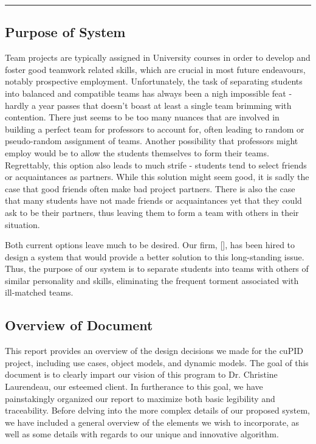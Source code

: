 \documentclass[12pt,letterpaper]{article}
\begin{document}
\begin{center}
    \rule{0.85\textwidth}{0.5pt}
\end{center}

\subsection{Purpose of System}

Team projects are typically assigned in University courses in order to develop and foster
good teamwork related skills, which are crucial in most future endeavours, notably 
prospective employment. Unfortunately, the task of separating students into balanced 
and compatible teams has always been a nigh impossible feat - hardly a year passes that doesn't
boast at least a single team brimming with  contention. There just seems to be too many
nuances that are involved in building a perfect team for professors to account for, often leading
to random or pseudo-random assignment of teams. Another possibility that professors might employ
would be to allow the students themselves to form their teams. Regrettably, this option also
leads to much strife - students tend to select friends or acquaintances as partners. While this
solution might seem good, it is sadly the case that good friends often make bad project partners. 
There is also the case that many students have not made friends or acquaintances yet that they 
could ask to be their partners, thus leaving them to form a team with others in their situation.

Both current options leave much to be desired. Our firm, [\teamname{}], has been hired
to design a system that would provide a better solution to this long-standing issue. Thus, the purpose of
our system is to separate students into teams with others of similar personality and skills, eliminating 
the frequent torment associated with ill-matched teams.

\subsection{Overview of Document}

This report provides an overview of the design decisions we made for the cuPID project, including 
use cases, object models, and dynamic models. The goal of this document is to clearly impart our vision of this
program to Dr. Christine Laurendeau, our esteemed client. In furtherance to this goal, we have painstakingly 
organized our report to maximize both basic legibility and traceability. Before delving into the more complex details 
of our proposed system, we have included a general overview of the elements we wish to incorporate, as well as 
some details with regards to our unique and innovative algorithm.
\end{document}
